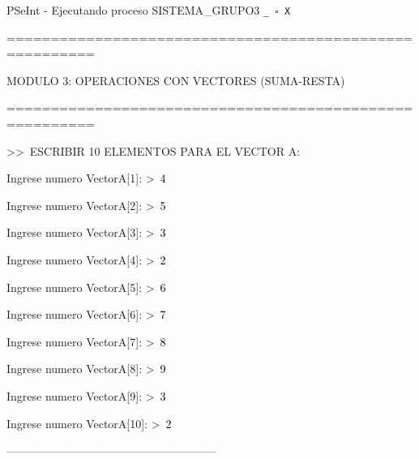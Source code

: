 \documentclass[12pt,a4paper]{article}
\newcommand{\consola}[1]{\noindent\textcolor{pseString}{#1}}
\newcommand{\entrada}[1]{\textcolor{black}{#1}}
\newenvironment{PSeIntWindow}{%
	\begin{tcolorbox}[
		breakable,
		enhanced,
		colback=white,
		colframe=black!60,
		boxrule=0.5pt,
		arc=1mm,
		left=0mm,
		right=0mm,
		top=0mm,
		bottom=2mm,
		width=\textwidth
		]
	}{%
	\end{tcolorbox}
}
\newcommand{\BarraPSeInt}{%
	\colorbox{gray!20}{%
		\parbox{\dimexpr\textwidth-2\fboxsep\relax}{%
			\small
			\textcolor{pseString}{\faPlayCircle}
			\hspace{0.3em}
			PSeInt - Ejecutando proceso SISTEMA\_GRUPO3
			\hfill
			\texttt{\_ \hspace{0.5em} \(\square\) \hspace{0.5em} X}
		}
	}
}
\begin{document}
	\begin{PSeIntWindow}
		
		\BarraPSeInt
		
		\vspace{0.2cm}
		
		\ttfamily
		\small
		
		\consola{========================================================}\par
		
		\begin{center}
			\textcolor{pseString}{MODULO 3: OPERACIONES CON VECTORES (SUMA-RESTA)}
		\end{center}
		
		\consola{========================================================}\par
		
		\vspace{0.2cm}
		
		\consola{\textgreater\textgreater\ ESCRIBIR 10 ELEMENTOS PARA EL VECTOR A:}\par
		
		\vspace{0.15cm}
		
		\consola{Ingrese numero VectorA[1]: \textgreater\ }\entrada{4}\par
		\consola{Ingrese numero VectorA[2]: \textgreater\ }\entrada{5}\par
		\consola{Ingrese numero VectorA[3]: \textgreater\ }\entrada{3}\par
		\consola{Ingrese numero VectorA[4]: \textgreater\ }\entrada{2}\par
		\consola{Ingrese numero VectorA[5]: \textgreater\ }\entrada{6}\par
		\consola{Ingrese numero VectorA[6]: \textgreater\ }\entrada{7}\par
		\consola{Ingrese numero VectorA[7]: \textgreater\ }\entrada{8}\par
		\consola{Ingrese numero VectorA[8]: \textgreater\ }\entrada{9}\par
		\consola{Ingrese numero VectorA[9]: \textgreater\ }\entrada{3}\par
		\consola{Ingrese numero VectorA[10]: \textgreater\ }\entrada{2}\par
		
		\vspace{0.2cm}
		
		\consola{--------------------------------------------------------}\par
		

\end{PSeIntWindow}
\end{document}

